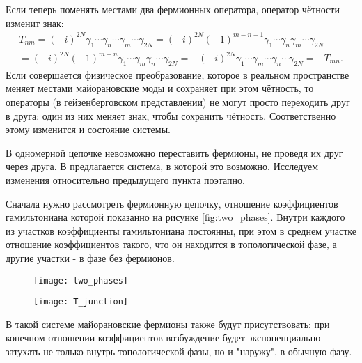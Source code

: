 \documentclass[a4paper,12pt]{article}
\theoremstyle{plain} %
\theoremstyle{definition} %
\theoremstyle{remark} %
\begin{document}
Если теперь поменять местами два фермионных оператора, оператор чётности изменит знак:
\begin{multline}
T_{nm} = (-i)^{2N} \gamma_1 \dotsm \gamma_n \dotsm \gamma_m \dotsm \gamma_{2N} = 
    (-i)^{2N} (-1)^{m-n-1} \gamma_1 \dotsm \gamma_n \gamma_m \dotsm \gamma_{2N} \\ =
    (-i)^{2N} (-1)^{m-n} \gamma_1 \dotsm \gamma_m \gamma_n \dotsm \gamma_{2N} = 
     - (-i)^{2N} \gamma_1 \dotsm \gamma_m \dotsm \gamma_n \dotsm \gamma_{2N} = 
     - T_{mn}.
\end{multline}
Если совершается физическое преобразование, которое в реальном пространстве меняет местами майорановские моды и сохраняет при этом чётность, то операторы (в гейзенберговском представлении) не могут просто переходить друг в друга: один из них меняет знак, чтобы сохранить чётность. Соответственно этому изменится и состояние системы.

В одномерной цепочке невозможно переставить фермионы, не проведя их друг через друга. В \cite{braiding} предлагается система, в которой это возможно. Исследуем изменения относительно предыдущего пункта поэтапно.

Сначала нужно рассмотреть фермионную цепочку, отношение коэффициентов гамильтониана которой показанно на рисунке \ref{fig:two_phases}. Внутри каждого из участков коэффициенты гамильтониана постоянны, при этом в среднем участке отношение коэффициентов такого, что он находится в топологической фазе, а другие участки - в фазе без фермионов.

\begin{figure}
    \centering
    \begin{minipage}{.5\textwidth}
        \centering
        \texttt{[image: two\_phases]}
        \captionsetup{width=0.9\textwidth}
        \label{fig:two_phases}
    \end{minipage}%
    \begin{minipage}{.5\textwidth}
        \centering
        \texttt{[image: T\_junction]}
        \captionsetup{width=0.9\textwidth}
        \label{fig:t_junction}
    \end{minipage}
\end{figure}

В такой системе майорановские фермионы также будут присутствовать; при конечном отношении коэффициентов возбуждение будет экспоненциально затухать не только внутрь топологической фазы, но и "наружу"$ $, в обычную фазу.
\end{document}
